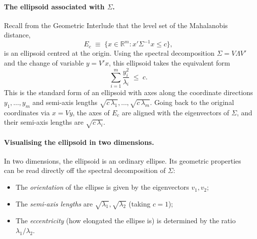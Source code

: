 \documentclass[11pt, a4paper, oneside]{article}
\begin{document}
\paragraph{The ellipsoid associated with $\Sigma$.}
Recall from the Geometric Interlude that the level set of the
Mahalanobis distance,
\[
E_c \;\equiv\; \{x \in \mathbb{R}^m : x' \Sigma^{-1} x \leq c\},
\]
is an ellipsoid centred at the origin. Using the spectral
decomposition $\Sigma = V \Lambda V'$ and the change of variable
$y = V' x$, this ellipsoid takes the equivalent form
\[
\sum_{i=1}^m \frac{y_i^2}{\lambda_i} \;\leq\; c.
\]
This is the standard form of an ellipsoid with axes along the
coordinate directions $y_1, \ldots, y_m$ and semi-axis lengths
$\sqrt{c\, \lambda_1}, \ldots, \sqrt{c\, \lambda_m}$. Going back to
the original coordinates via $x = V y$, the axes of $E_c$ are aligned
with the eigenvectors of $\Sigma$, and their semi-axis lengths are
$\sqrt{c\, \lambda_i}$.

\paragraph{Visualising the ellipsoid in two dimensions.}
In two dimensions, the ellipsoid is an ordinary ellipse. Its
geometric properties can be read directly off the spectral
decomposition of $\Sigma$:
\begin{itemize}[leftmargin=1.5em, itemsep=2pt]
    \item The \emph{orientation} of the ellipse is given by the
          eigenvectors $v_1, v_2$;
    \item The \emph{semi-axis lengths} are
          $\sqrt{\lambda_1}, \sqrt{\lambda_2}$ (taking $c = 1$);
    \item The \emph{eccentricity} (how elongated the ellipse is) is
          determined by the ratio $\lambda_1/\lambda_2$.
\end{itemize}
\end{document}
